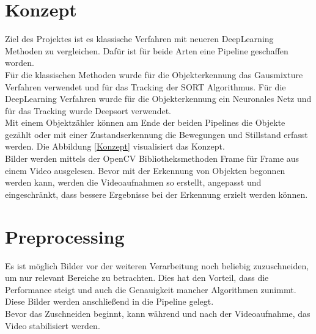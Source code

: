 \documentclass[conference]{IEEEtran}
\begin{document}
	\section{Konzept}
	Ziel des Projektes ist es klassische Verfahren mit neueren DeepLearning Methoden zu vergleichen.
	Dafür ist für beide Arten eine Pipeline geschaffen worden.\\
	Für die klassischen Methoden wurde für die Objekterkennung das Gausmixture Verfahren verwendet und für das Tracking der SORT Algorithmus. Für die DeepLearning Verfahren wurde für die Objekterkennung ein Neuronales Netz und für das Tracking wurde Deepsort verwendet.\\
	Mit einem Objektzähler können am Ende der beiden Pipelines die Objekte gezählt oder mit einer Zustandserkennung die Bewegungen und Stillstand erfasst werden. Die Abbildung \ref{Konzept} visualisiert das Konzept.\\
	Bilder werden mittels der OpenCV Bibliotheksmethoden Frame für Frame aus einem Video ausgelesen.
	Bevor mit der Erkennung von Objekten begonnen werden kann, werden die Videoaufnahmen so erstellt, angepasst und eingeschränkt, dass bessere Ergebnisse bei der Erkennung erzielt werden können.
	\section{Preprocessing}
	Es ist möglich Bilder vor der weiteren Verarbeitung noch beliebig zuzuschneiden, um nur relevant Bereiche zu betrachten. Dies hat den Vorteil, dass die Performance steigt und auch die Genauigkeit mancher Algorithmen zunimmt. Diese Bilder werden anschließend in die Pipeline gelegt.\\
	Bevor das Zuschneiden beginnt, kann während und nach der Videoaufnahme, das Video stabilisiert werden.
\end{document}
